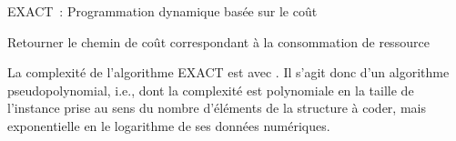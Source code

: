 \documentclass[10pt,francais]{llncs}
\begin{document}
\begin{algorithm}\label{algo-exact}
\caption{EXACT~: Programmation dynamique bas\'ee sur le co\^ut}
\BlankLine

{}\;

{}\;

\lPourTous{}{}\;

\Tq{}
{
	{}\;
	\PourTous{}
	{
	 	\;
	 	\PourTous{}
		{
	  		\lSi{}{}\;
		}
	}
}
Retourner le chemin de co\^ut  correspondant \`a la consommation de ressource 
\end{algorithm}

La complexit\'e de l'algorithme EXACT est  avec . Il s'agit donc d'un algorithme pseudopolynomial, i.e., dont la complexit\'e est polynomiale en la taille de l'instance prise au sens du nombre d'\'el\'ements de la structure \`a coder, mais exponentielle en le logarithme de ses donn\'ees num\'eriques.\\
\end{document}
